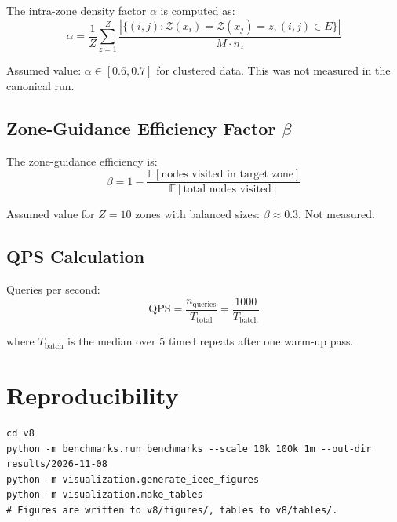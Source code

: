 \documentclass[11pt,a4paper]{article}
\newcommand{\qps}{\text{QPS}}
\begin{document}
The intra-zone density factor $\alpha$ is computed as:
\[
\alpha = \frac{1}{Z} \sum_{z=1}^{Z} \frac{|\{(i,j) : \mathcal{Z}(x_i) = \mathcal{Z}(x_j) = z, (i,j) \in E\}|}{M \cdot n_z}
\]

Assumed value: $\alpha \in [0.6, 0.7]$ for clustered data. This was not measured in the canonical run.

\subsection{Zone-Guidance Efficiency Factor $\beta$}

The zone-guidance efficiency is:
\[
\beta = 1 - \frac{\mathbb{E}[\text{nodes visited in target zone}]}{\mathbb{E}[\text{total nodes visited}]}
\]

Assumed value for $Z = 10$ zones with balanced sizes: $\beta \approx 0.3$. Not measured.

\subsection{QPS Calculation}

Queries per second:
\[
\qps = \frac{n_{\text{queries}}}{T_{\text{total}}} = \frac{1000}{T_{\text{batch}}}
\]

where $T_{\text{batch}}$ is the median over 5 timed repeats after one warm-up pass.

\section{Reproducibility}

\begin{verbatim}
cd v8
python -m benchmarks.run_benchmarks --scale 10k 100k 1m --out-dir results/2026-11-08
python -m visualization.generate_ieee_figures
python -m visualization.make_tables
# Figures are written to v8/figures/, tables to v8/tables/.
\end{verbatim}
\end{document}
